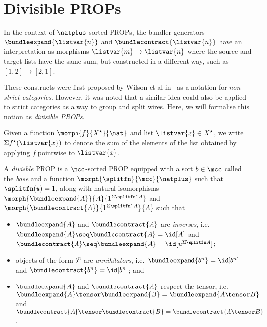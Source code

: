 \section{Divisible PROPs}

In the context of \(\natplus\)-sorted PROPs, the bundler generators
\(\bundleexpand{\listvar{n}}\) and \(\bundlecontract{\listvar{n}}\) have an
interpretation as morphisms
\(\listvar{m} \to \listvar{n}\) where the source and target lists have the
same sum, but constructed in a different way, such as \([1,2] \to [2,1]\).


These constructs were first proposed by Wilson et al in~\cite{wilson2023string}
as a notation for \emph{non-strict categories}.
However, it was noted that a similar idea could also be applied to strict
categories as a way to group and split wires.
Here, we will formalise this notion as \emph{divisible PROPs}.

\begin{notation}
    Given a function \(\morph{f}{X^\star}{\nat}\) and list
    \(\listvar{x} \in X^\star\), we write \(\Sigma{f^\star(\listvar{x})}\) to
    denote the sum of the elements of the list obtained by applying \(f\)
    pointwise to \(\listvar{x}\).
\end{notation}

\begin{definition}
    A \emph{divisble} PROP is a \(\mcc\)-sorted PROP equipped
    with a sort \(b \in \mcc\) called the \emph{base} and a function \(
        \morph{\splitfn}{\mcc}{\natplus}
    \) such that \(\splitfn(u) = 1\), along with natural isomorphisms \(
        \morph{\bundleexpand{A}}{A}{1^{\Sigma\splitfn^\star{A}}}
    \) and \(
        \morph{\bundlecontract{A}}{1^{\Sigma\splitfn^\star{A}}}{A}
    \) such that
    \begin{itemize}
        \item \(\bundleexpand{A}\) and \(\bundlecontract{A}\)
                are \emph{inverses}, i.e.\ \(
                    \bundleexpand{A} \seq \bundlecontract{A} = \id[A]
                \) and \(
                    \bundlecontract{A} \seq \bundleexpand{A} = \id[u^{\Sigma\splitfn A}]
                \);
        \item objects of the form \(b^{n}\) are \emph{annihilators},
                i.e.\ \(
                    \bundleexpand{b^n} = \id[b^n]
                \) and \(
                    \bundlecontract{b^n} = \id[b^n]
                \); and
        \item \(\bundleexpand{A}\) and \(\bundlecontract{A}\) respect the
                tensor, i.e.\ \(
                    \bundleexpand{A} \tensor \bundleexpand{B}
                    =
                    \bundleexpand{A \tensor B}
                \) and \(
                    \bundlecontract{A} \tensor \bundlecontract{B}
                    =
                    \bundlecontract{A \tensor B}
                \).
    \end{itemize}
\end{definition}

